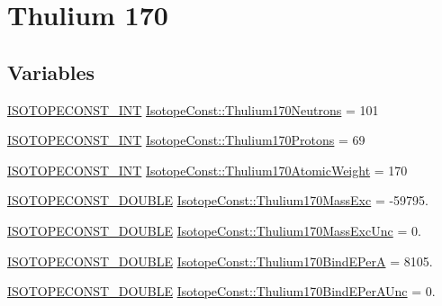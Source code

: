 \hypertarget{group___isotope_const-_thulium-_tm170}{}\section{Thulium 170}
\label{group___isotope_const-_thulium-_tm170}
\subsection*{Variables}
\begin{DoxyCompactItemize}
\item 
\mbox{\hyperlink{group___isotope_const-_macros_ga5f18360b3e99483a35c32d789e62621c}{I\+S\+O\+T\+O\+P\+E\+C\+O\+N\+S\+T\+\_\+\+I\+NT}} \mbox{\hyperlink{group___isotope_const-_thulium-_tm170_ga648194ba41232d10ef077a502ac33cf0}{Isotope\+Const\+::\+Thulium170\+Neutrons}} = 101
\item 
\mbox{\hyperlink{group___isotope_const-_macros_ga5f18360b3e99483a35c32d789e62621c}{I\+S\+O\+T\+O\+P\+E\+C\+O\+N\+S\+T\+\_\+\+I\+NT}} \mbox{\hyperlink{group___isotope_const-_thulium-_tm170_ga2729fc7f5a74139bf5a54f4e786fc47c}{Isotope\+Const\+::\+Thulium170\+Protons}} = 69
\item 
\mbox{\hyperlink{group___isotope_const-_macros_ga5f18360b3e99483a35c32d789e62621c}{I\+S\+O\+T\+O\+P\+E\+C\+O\+N\+S\+T\+\_\+\+I\+NT}} \mbox{\hyperlink{group___isotope_const-_thulium-_tm170_gaf92c626e4406455c7d0b209d01cec273}{Isotope\+Const\+::\+Thulium170\+Atomic\+Weight}} = 170
\item 
\mbox{\hyperlink{group___isotope_const-_macros_ga8f45a7272ce02c0b4c65c44636ed719a}{I\+S\+O\+T\+O\+P\+E\+C\+O\+N\+S\+T\+\_\+\+D\+O\+U\+B\+LE}} \mbox{\hyperlink{group___isotope_const-_thulium-_tm170_gaa45f2fc4b973b5ff459fbadd82615698}{Isotope\+Const\+::\+Thulium170\+Mass\+Exc}} = -\/59795.
\item 
\mbox{\hyperlink{group___isotope_const-_macros_ga8f45a7272ce02c0b4c65c44636ed719a}{I\+S\+O\+T\+O\+P\+E\+C\+O\+N\+S\+T\+\_\+\+D\+O\+U\+B\+LE}} \mbox{\hyperlink{group___isotope_const-_thulium-_tm170_gad8147f34a4f3a4317b7daa4e1da4cfff}{Isotope\+Const\+::\+Thulium170\+Mass\+Exc\+Unc}} = 0.
\item 
\mbox{\hyperlink{group___isotope_const-_macros_ga8f45a7272ce02c0b4c65c44636ed719a}{I\+S\+O\+T\+O\+P\+E\+C\+O\+N\+S\+T\+\_\+\+D\+O\+U\+B\+LE}} \mbox{\hyperlink{group___isotope_const-_thulium-_tm170_ga628d7e78f3b40ad2ff840f01cd1c42b3}{Isotope\+Const\+::\+Thulium170\+Bind\+E\+PerA}} = 8105.
\item 
\mbox{\hyperlink{group___isotope_const-_macros_ga8f45a7272ce02c0b4c65c44636ed719a}{I\+S\+O\+T\+O\+P\+E\+C\+O\+N\+S\+T\+\_\+\+D\+O\+U\+B\+LE}} \mbox{\hyperlink{group___isotope_const-_thulium-_tm170_ga6a42268296d5255e133d794f19a4ef6b}{Isotope\+Const\+::\+Thulium170\+Bind\+E\+Per\+A\+Unc}} = 0.

\end{DoxyCompactItemize}
